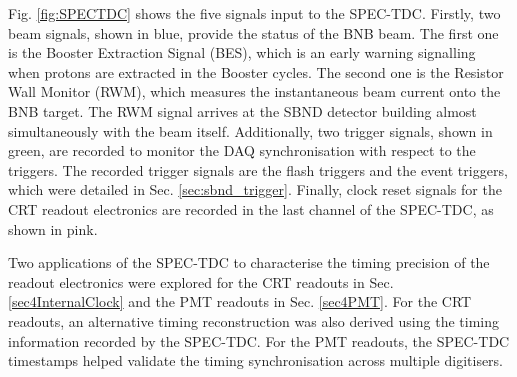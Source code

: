 Fig. \ref{fig:SPECTDC} shows the five signals input to the SPEC-TDC. 
Firstly, two beam signals, shown in blue, provide the status of the BNB beam.
The first one is the Booster Extraction Signal (BES), which is an early warning signalling when protons are extracted in the Booster cycles.
The second one is the Resistor Wall Monitor (RWM), which measures the instantaneous beam current onto the BNB target.
The RWM signal arrives at the SBND detector building almost simultaneously with the beam itself.
Additionally, two trigger signals, shown in green, are recorded to monitor the DAQ synchronisation with respect to the triggers. 
The recorded trigger signals are the flash triggers and the event triggers, which were detailed in Sec. \ref{sec:sbnd_trigger}.
Finally, clock reset signals for the CRT readout electronics are recorded in the last channel of the SPEC-TDC, as shown in pink. 

Two applications of the SPEC-TDC to characterise the timing precision of the readout electronics were explored for the CRT readouts in Sec. \ref{sec4InternalClock} and the PMT readouts in Sec. \ref{sec4PMT}.
For the CRT readouts, an alternative timing reconstruction was also derived using the timing information recorded by the SPEC-TDC.
For the PMT readouts, the SPEC-TDC timestamps helped validate the timing synchronisation across multiple digitisers. 



